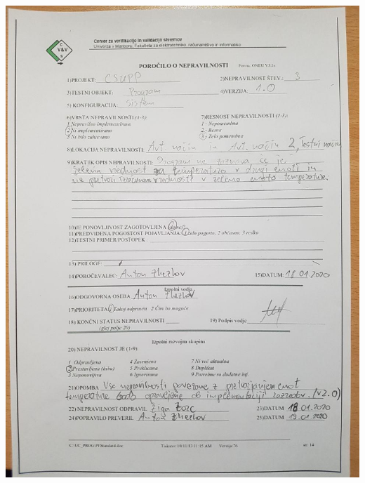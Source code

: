 \documentclass[a4paper,12pt]{article}
\begin{document}
{	\includegraphics[width=15cm]{porocila/03.jpg}
	
\newpage
	
	\hspace{2cm}

	\vspace{2cm}
	
}
\end{document}
